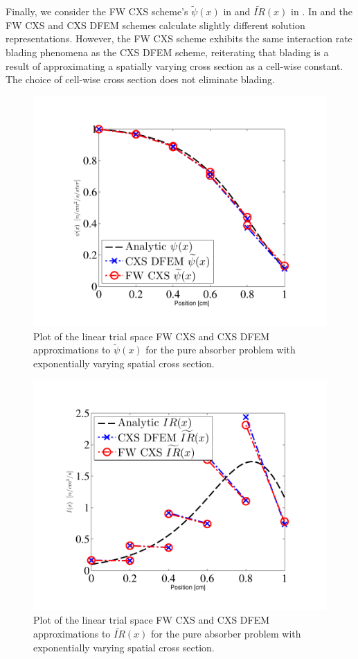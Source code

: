 Finally, we consider the FW CXS scheme's $\widetilde{\psi}(x)$ in  and $\widetilde{IR}(x)$ in .  
In  and  the FW CXS and CXS DFEM schemes calculate slightly different solution representations.
However, the FW CXS scheme  exhibits the same interaction rate blading phenomena as the CXS DFEM scheme, reiterating that blading is a result of approximating a spatially varying cross section as a cell-wise constant.
The choice of cell-wise cross section does not eliminate blading.
\begin{figure}[!hbp]
\centering
\includegraphics[width=12cm]{chapter3_variable_xs/FW_Psi_Blades.pdf}
\caption{Plot of the linear trial space FW CXS and CXS DFEM approximations to $\widetilde{\psi}(x)$ for the pure absorber problem with exponentially varying spatial cross section.}
\label{fig:fw_blading_psi}
\end{figure}
%
%
\begin{figure}[!htp]
\centering
\includegraphics[width=12cm]{chapter3_variable_xs/FW_I_Blades.pdf}
\caption{Plot of the linear trial space FW CXS and CXS DFEM approximations to $\widetilde{IR}(x)$ for the pure absorber problem with exponentially varying spatial cross section.}
\label{fig:fw_blading_ir}
\end{figure}
%
%
%
